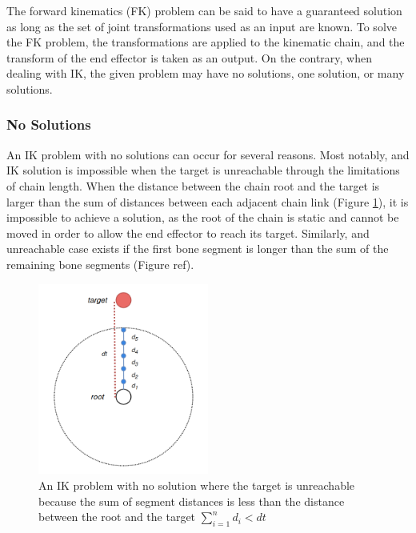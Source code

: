 The forward kinematics (FK) problem can be said to have a guaranteed solution as
long as the set of joint transformations used as an input are known. To solve
the FK problem, the transformations are applied to the kinematic chain, and the
transform of the end effector is taken as an output. On the contrary, when
dealing with IK, the given problem may have no solutions, one solution, or many
solutions. 

\subsubsection{No Solutions}
An IK problem with no solutions can occur for several reasons. Most notably, and
IK solution is impossible when the target is unreachable through the limitations
of chain length. When the distance between the chain root and the target is
larger than the sum of distances between each adjacent chain link (Figure
\ref{fig:unreachable_dist1}), it is impossible to achieve a solution, as the
root of the chain is static and cannot be moved in order to allow the end
effector to reach its target. Similarly, and unreachable case exists if the
first bone segment is longer than the sum of the remaining bone segments (Figure
ref).

\begin{figure}[!h]
    \centering
    \captionsetup{justification=centering}
    \includegraphics[width=0.5\textwidth]{grafika/unreachable_dist_1.png}
    \caption{An IK problem with no solution where the target is unreachable
    because the sum of segment distances is less than the distance between the
    root and the target \(\sum_{i=1}^{n}d_i < dt\) }
    \label{fig:unreachable_dist1}
\end{figure}

